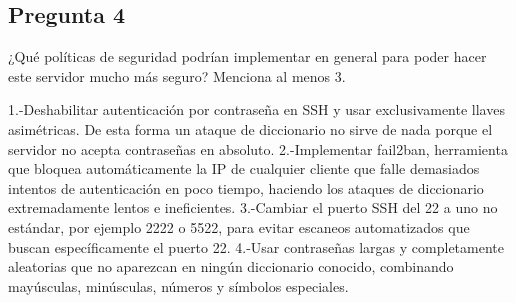 \subsection{Pregunta 4}

¿Qué políticas de seguridad podrían implementar en general para poder hacer este servidor mucho más seguro? Menciona al menos 3.

\begin{respuesta}
1.-Deshabilitar autenticación por contraseña en SSH y usar exclusivamente llaves asimétricas. De esta forma un ataque de diccionario no sirve de nada porque el servidor no acepta contraseñas en absoluto.
2.-Implementar fail2ban, herramienta que bloquea automáticamente la IP de cualquier cliente que falle demasiados intentos de autenticación en poco tiempo, haciendo los ataques de diccionario extremadamente lentos e ineficientes.
3.-Cambiar el puerto SSH del 22 a uno no estándar, por ejemplo 2222 o 5522, para evitar escaneos automatizados que buscan específicamente el puerto 22.
4.-Usar contraseñas largas y completamente aleatorias que no aparezcan en ningún diccionario conocido, combinando mayúsculas, minúsculas, números y símbolos especiales.

    
\end{respuesta}
